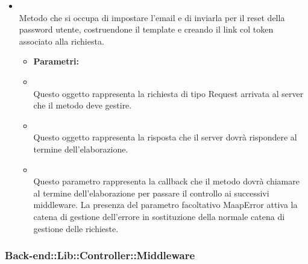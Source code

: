 \begin{itemize}
\item[] \textbf{} \\ Metodo che si occupa di impostare l'email e di inviarla per il reset della password utente, costruendone il template e creando il link col token associato alla richiesta.
\begin{itemize}\addtolength{\itemsep}{-0.5\baselineskip}
\item[] \textbf{Parametri:}
\item[]  \\ Questo oggetto rappresenta la richiesta di tipo Request arrivata al server che il metodo deve gestire.
\item[]  \\ Questo oggetto rappresenta la risposta che il server dovrà rispondere al termine dell'elaborazione.
\item[]  \\ Questo parametro rappresenta la callback che il metodo dovrà chiamare al termine dell'elaborazione per passare il controllo ai successivi middleware. La presenza del parametro facoltativo MaapError attiva la catena di gestione dell'errore in sostituzione della normale catena di gestione delle richieste.
\end{itemize}
\end{itemize}

	\subsubsection{Back-end::Lib::Controller::Middleware} 

